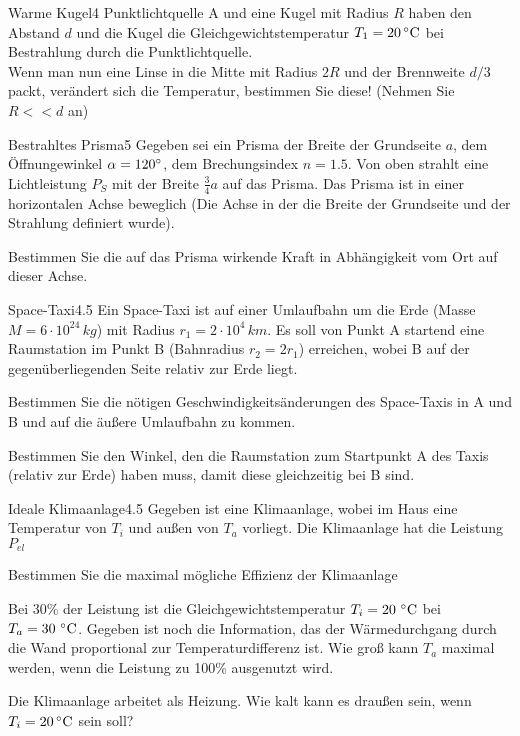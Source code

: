 

\begin{problem}{Warme Kugel}{4}
Punktlichtquelle A und eine Kugel mit Radius $R$ haben den Abstand $d$ und die Kugel die Gleichgewichtstemperatur $T_1=20\,\mathrm{^\circ C}$ bei Bestrahlung durch die Punktlichtquelle.\\
Wenn man nun eine Linse in die Mitte mit Radius $2R$ und der Brennweite $d/3$ packt, verändert sich die Temperatur, bestimmen Sie diese! (Nehmen Sie $R<<d$ an)
\end{problem}

\begin{problem}{Bestrahltes Prisma}{5}
Gegeben sei ein Prisma der Breite der Grundseite $a$, dem Öffnungewinkel $\alpha=120^\circ$, dem Brechungsindex $n=1.5$. Von oben strahlt eine Lichtleistung $P_S$ mit der Breite $\frac{3}{4} a$ auf das Prisma. Das Prisma ist in einer horizontalen Achse beweglich (Die Achse in der die Breite der Grundseite und der Strahlung definiert wurde).
\begin{abcenum}
\item Bestimmen Sie die auf das Prisma wirkende Kraft in Abhängigkeit vom Ort auf dieser Achse.
\end{abcenum}
\end{problem}

\begin{problem}{Space-Taxi}{4.5}
Ein Space-Taxi ist auf einer Umlaufbahn um die Erde (Masse $M=6\cdot 10^{24}\,kg$) mit Radius $r_1=2\cdot 10^4\,km$. Es soll von Punkt A startend eine Raumstation im Punkt B (Bahnradius $r_2=2r_1$) erreichen, wobei B auf der gegenüberliegenden Seite relativ zur Erde liegt.
\begin{abcenum}
\item Bestimmen Sie die nötigen Geschwindigkeitsänderungen des Space-Taxis in A und B und auf die äußere Umlaufbahn zu kommen.
\item Bestimmen Sie den Winkel, den die Raumstation zum Startpunkt A des Taxis (relativ zur Erde) haben muss, damit diese gleichzeitig bei B sind.
\end{abcenum}
\end{problem}

\begin{problem}{Ideale Klimaanlage}{4.5}
Gegeben ist eine Klimaanlage, wobei im Haus eine Temperatur von $T_i$ und außen von $T_a$ vorliegt. Die Klimaanlage hat die Leistung $P_{el}$
\begin{abcenum}
\item Bestimmen Sie die maximal mögliche Effizienz der Klimaanlage
\item Bei 30\% der Leistung ist die Gleichgewichtstemperatur $T_i=20\,\mathrm{\,\mathrm{^\circ C}}$ bei $T_a=30\,\mathrm{\,\mathrm{^\circ C}}$. Gegeben ist noch die Information, das der Wärmedurchgang durch die Wand proportional zur Temperaturdifferenz ist. Wie groß kann $T_a$ maximal werden, wenn die Leistung zu 100\% ausgenutzt wird.
\item Die Klimaanlage arbeitet als Heizung. Wie kalt kann es draußen sein, wenn $T_i=20\,\mathrm{^\circ C}$ sein soll?
\end{abcenum}
\end{problem}


